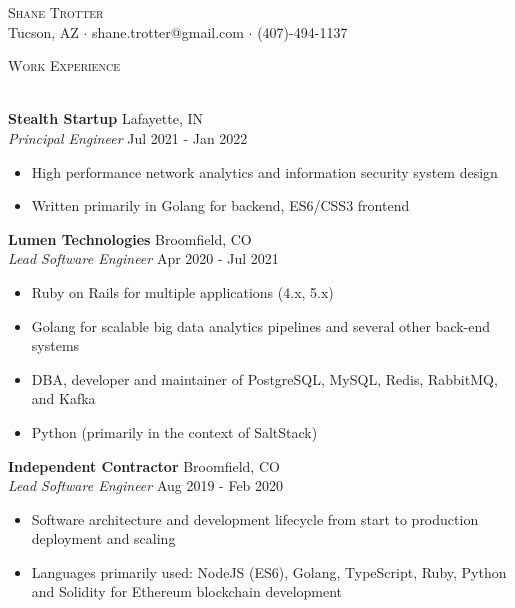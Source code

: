 \documentclass[a4paper]{article}
\newcommand{\lineunder} {
    \vspace*{-8pt} \\
    \hspace*{-18pt} \hrulefill \\
}
\newcommand{\header} [1] {
    {\hspace*{-18pt}\vspace*{6pt} \textsc{#1}}
    \vspace*{-6pt} \lineunder
}
\begin{document}
\vspace*{-38pt}
{\selectfont

\vspace*{-10pt}
\begin{center}
	{\Huge \scshape {Shane Trotter}}\\
	Tucson, AZ $\cdot$ shane.trotter@gmail.com $\cdot$ (407)-494-1137\\
\end{center}

\header{Work Experience}
\vspace{1mm}

\textbf{Stealth Startup} \hfill Lafayette, IN\\
\textit{Principal Engineer} \hfill Jul 2021 - Jan 2022\\
\vspace{-1mm}
\begin{itemize} \itemsep 1pt
	\item High performance network analytics and information security system design
	\item Written primarily in Golang for backend, ES6/CSS3 frontend
\end{itemize}
\textbf{Lumen Technologies} \hfill Broomfield, CO\\
\textit{Lead Software Engineer} \hfill Apr 2020 - Jul 2021\\
\vspace{-1mm}
\begin{itemize} \itemsep 1pt
	\item Ruby on Rails for multiple applications (4.x, 5.x)
	\item Golang for scalable big data analytics pipelines and several other back-end systems
	\item DBA, developer and maintainer of PostgreSQL, MySQL, Redis, RabbitMQ, and Kafka
	\item Python (primarily in the context of SaltStack)
\end{itemize}
\textbf{Independent Contractor} \hfill Broomfield, CO\\
\textit{Lead Software Engineer} \hfill Aug 2019 - Feb 2020\\
\vspace{-1mm}
\begin{itemize} \itemsep 1pt
	\item Software architecture and development lifecycle from start to production deployment and scaling
	\item Languages primarily used: NodeJS (ES6), Golang, TypeScript, Ruby, Python and Solidity for Ethereum blockchain development

\end{itemize}}
\end{document}

